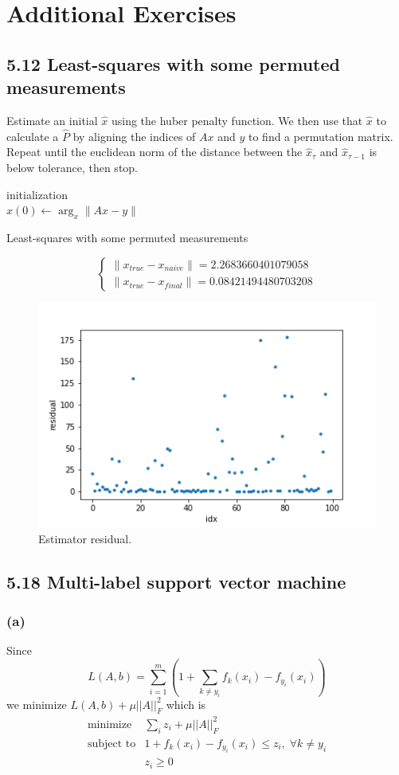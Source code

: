 \documentclass{article}
\begin{document}
\section*{Additional Exercises}
\subsection*{5.12 Least-squares with some permuted measurements}
Estimate an initial $\hat{x}$ using the huber penalty function. We then use that $\hat{x}$ to calculate a $\hat{P}$ by aligning the indices of $Ax$ and $y$ to find a permutation matrix.  Repeat until the euclidean norm of the distance between the $\hat{x}_{\tau}$ and $\hat{x}_{\tau-1}$ is below  tolerance, then stop.\\

\begin{algorithm}[H]
\SetAlgoLined
 initialization \\
 $x(0) \leftarrow \arg_x \|Ax -y\|$\;
 \caption{Least-squares with some permuted measurements}
\end{algorithm}
\[ \begin{cases}
 \|x_{true} - x_{naive}\|  = 2.2683660401079058\\
 \|x_{true} - x_{final}\|  = 0.08421494480703208 
\end{cases}
\]
 
  \begin{figure}[h!]
\begin{center}
  \includegraphics[width=.4\linewidth]{prob_152.png}
\end{center}
\caption{Estimator residual.}
\end{figure}
\subsection*{5.18  Multi-label support vector machine}
\subsubsection*{(a)}
Since
\[L(A,b) = \sum_{i =1}^m (1 + \sum_{k \ne y_i}f_k(x_i)   -f_{y_i}(x_i) )\]
we minimize $L(A,b) +\mu ||A||_F^2  $ which is 
 \[  \boxed{  \begin{array}{ll}
    \mbox{minimize}   &\sum_i z_i + \mu ||A||_F^2  \\
    \mbox{subject to} &1+f_k(x_i)   -f_{y_i}(x_i) \leq z_i, \; \forall k \ne y_i\\
    & z_i \ge 0
        \end{array} 
   }
  \]   
\end{document}

